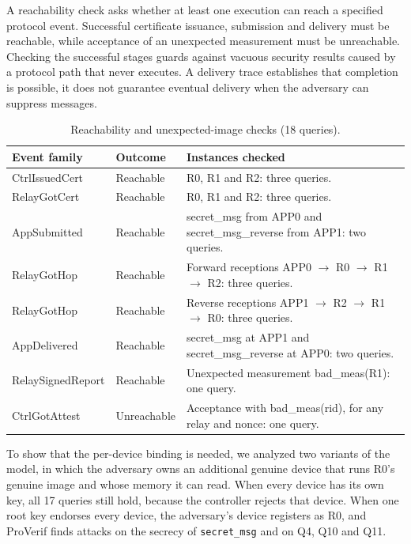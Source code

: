 \documentclass[futureinternet,article,submit,moreauthors]{Definitions/mdpi}
\begin{document}
A reachability check asks whether at least one execution can reach a specified protocol event. Successful certificate issuance, submission and delivery must be reachable, while acceptance of an unexpected measurement must be unreachable. Checking the successful stages guards against vacuous security results caused by a protocol path that never executes. A delivery trace establishes that completion is possible, it does not guarantee eventual delivery when the adversary can suppress messages.

\begin{table}[H]
\caption{Reachability and unexpected-image checks (18 queries).\label{tab:reachability}}
\begin{tabularx}{\textwidth}{llL}
\toprule
\textbf{Event family} & \textbf{Outcome} & \textbf{Instances checked}\\
\midrule
CtrlIssuedCert & Reachable & R0, R1 and R2: three queries.\\
RelayGotCert & Reachable & R0, R1 and R2: three queries.\\
AppSubmitted & Reachable & secret\_msg from APP0 and secret\_msg\_reverse from APP1: two queries.\\
RelayGotHop & Reachable & Forward receptions APP0 $\rightarrow$ R0 $\rightarrow$ R1 $\rightarrow$ R2: three queries.\\
RelayGotHop & Reachable & Reverse receptions APP1 $\rightarrow$ R2 $\rightarrow$ R1 $\rightarrow$ R0: three queries.\\
AppDelivered & Reachable & secret\_msg at APP1 and secret\_msg\_reverse at APP0: two queries.\\
RelaySignedReport & Reachable & Unexpected measurement bad\_meas(R1): one query.\\
CtrlGotAttest & Unreachable & Acceptance with bad\_meas(rid), for any relay and nonce: one query.\\
\bottomrule
\end{tabularx}
\end{table}

To show that the per-device binding is needed, we analyzed two variants of the model, in which the adversary owns an additional genuine device that runs R0's genuine image and whose memory it can read. When every device has its own key, all 17 queries still hold, because the controller rejects that device. When one root key endorses every device, the adversary's device registers as R0, and ProVerif finds attacks on the secrecy of \texttt{secret\_msg} and on Q4, Q10 and Q11.
\end{document}
